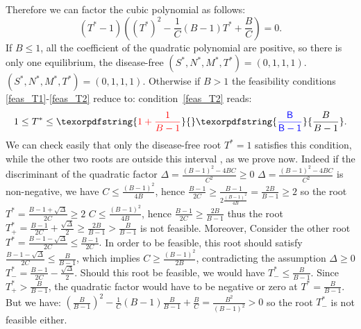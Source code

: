 \documentclass[a4paper, 12pt]{article}
\providecommand{\DIFaddtex}[1]{{\protect\color{blue} \sf #1}} %
\providecommand{\DIFdeltex}[1]{{\protect\color{red} \scriptsize #1}} %
\providecommand{\DIFaddbegin}{} %
\providecommand{\DIFaddend}{} %
\providecommand{\DIFdelbegin}{} %
\providecommand{\DIFdelend}{} %
\providecommand{\DIFadd}[1]{\texorpdfstring{\DIFaddtex{#1}}{#1}} %
\providecommand{\DIFdel}[1]{\texorpdfstring{\DIFdeltex{#1}}{}} %
\begin{document}
Therefore we can factor the cubic polynomial as follows:
    \begin{equation}
    (T^* - 1) \left( \DIFaddbegin {\DIFaddend (T^*)\DIFaddbegin }\DIFaddend ^2 - \frac{1}{C} (B - 1) T^* + \frac{B}{C} \right) = 0.
    \label{eq:factored_cubic}
    \end{equation}
 If $B \leq 1$, all the coefficient of the quadratic polynomial are positive, so there is only one equilibrium, the disease-free \DIFdelbegin \DIFdel{$(S^*, N^*, M^*, T^*) = (0, 1, 1, 1).$ 
 }\DIFdelend \DIFaddbegin \DIFadd{$(S^*, N^*, M^*, T^*) = (0, 1, 1, 1)$. 
 }\DIFaddend Otherwise if $B>1$ the feasibility \DIFdelbegin \DIFdel{conditions \eqref{feas_T1}-\eqref{feas_T2} reduce to:
}\DIFdelend \DIFaddbegin \DIFadd{condition~\eqref{feas_T2} reads:
}\DIFaddend \begin{equation}
1 \leq T^* \leq \DIFdelbegin \DIFdel{1 + \frac{1}{B-1}}\DIFdelend \DIFaddbegin \DIFadd{\frac{B}{B-1}}\DIFaddend .
\end{equation}
 We can check easily that only the disease-free root $T^* = 1$ satisfies this condition, while the other two roots are outside this interval\DIFdelbegin \DIFdel{, as we prove now}\DIFdelend .
 Indeed if the discriminant of the quadratic factor \DIFdelbegin \DIFdel{$\Delta = \frac{(B-1)^2 - 4BC}{C^2} \geq 0$}\DIFdelend \DIFaddbegin \DIFadd{$\Delta = \frac{{(B-1)}^2 - 4BC}{C^2}$ is non-negative}\DIFaddend , we have \DIFdelbegin \DIFdel{$C \leq \frac{(B-1)^2}{4B}$, 
 hence $\frac{B-1}{2C} \geq \frac{B-1}{2 \frac{(B-1)^2}{4B}} = \frac{2B}{B-1} \geq 2  $ so  the root $T^* = \frac{B-1 + \sqrt{\Delta}}{2C} \geq 2  $ }\DIFdelend \DIFaddbegin \DIFadd{$C \leq \frac{{(B-1)}^2}{4B}$, 
 hence $\frac{B-1}{2C} \geq  \frac{2B}{B-1}$ thus the root $T_+^* = \frac{B-1}{2C} + \frac{\sqrt{\Delta}}{2} \geq \frac{2B}{B-1} > \frac{B}{B-1}  $ }\DIFaddend is not feasible.
 \DIFdelbegin \DIFdel{Moreover, }\DIFdelend \DIFaddbegin \DIFadd{Consider }\DIFaddend the other root \DIFdelbegin \DIFdel{$T^* = \frac{B-1 - \sqrt{\Delta}}{2C} \leq \frac{B-1}{2C}.$
 In order to be feasible, this root should satisfy $\frac{B-1 - \sqrt{\Delta}}{2C} \leq \frac{B}{B-1}$, which implies  $C \geq \frac{(B-1)^2}{2B}$, contradicting the assumption $\Delta \geq 0$}\DIFdelend \DIFaddbegin \DIFadd{$T_-^* = \frac{B-1}{2C} - \frac{\sqrt{\Delta}}{2}$.
 Should this root be feasible, we would have $ T_-^* \leq \frac{B}{B-1}$. Since $T_+^* > \frac{B}{B-1}$, the quadratic factor would have to be negative or zero at $T^* = \frac{B}{B-1}$. But we have: ${\left(\frac{B}{B-1}\right)}^2 - \frac{1}{C} (B - 1) \frac{B}{B-1} + \frac{B}{C} = \frac{B^2}{{(B-1)}^2} > 0$ so the root $T_-^*$ is not feasible either}\DIFaddend .  
\end{document}
